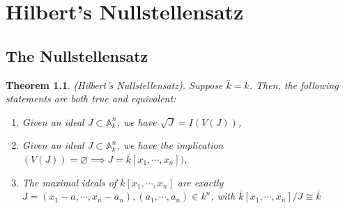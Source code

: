 \documentclass[]{report}
\newtheorem{theorem}{Theorem}[section]
\begin{document}
\chapter{Hilbert's Nullstellensatz}
\section{The Nullstellensatz}

\begin{theorem}
    (Hilbert's Nullstellensatz). Suppose $\bar{k} = k$. Then, the following statements are both true and equivalent:
    \begin{enumerate}
        \item Given an ideal $J\subset \mathbb{A}^n_k$, we have $\sqrt{J} = I(V(J))$,
        \item Given an ideal $J\subset \mathbb{A}^n_k$, we have the implication $(V(J)) = \varnothing \implies J = \bar{k}[x_1,\cdots,x_n])$,
        \item The maximal ideals of $k[x_1,\cdots,x_n]$ are exactly $J = (x_1-a,\cdots, x_n-a_n), (a_1,\cdots,a_n)\in k^n$, with $\bar{k}[x_1,\cdots,x_n]/J \cong \bar{k}$
    \end{enumerate}
\end{theorem}



\begin{thebibliography}{9}
\end{thebibliography}
\end{document}
